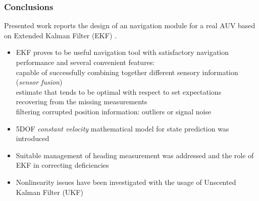 \begin{frame}\frametitle{Conclusions}
Presented work reports the design of an navigation module for a real AUV based on Extended Kalman Filter (EKF) .
\begin{itemize}
\item EKF proves to be useful navigation tool with satisfactory navigation performance and several convenient features: \\
{\scriptsize 
\hspace{0.5cm} capable of successfully combining together different sensory information (\textit{sensor fusion}) \\
\hspace{0.5cm} estimate that tends to be optimal with respect to set expectations \\
\hspace{0.5cm} recovering from the missing measurements \\
\hspace{0.5cm} filtering corrupted position information: outliers or signal noise \\
}
\item 5DOF \textit{constant velocity} mathematical model for state prediction was introduced 
\item Suitable management of heading measurement was addressed and the role of EKF in correcting deficiencies
\item Nonlinearity issues have been investigated with the usage of Unscented Kalman Filter (UKF)
\end{itemize} 
\end{frame}